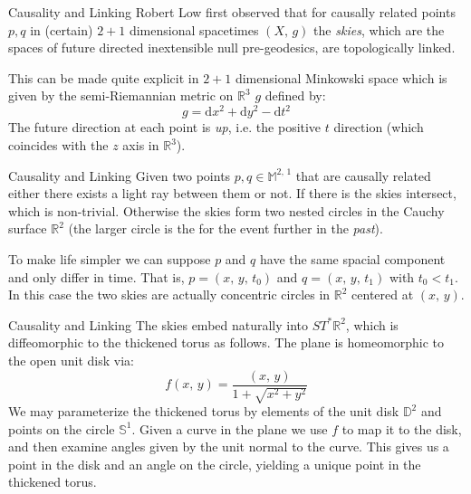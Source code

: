 \documentclass{beamer}
\begin{document}
    \begin{frame}{Causality and Linking}
        Robert Low first observed that for causally related points $p,q$ in
        (certain) $2+1$ dimensional spacetimes $(X,\,g)$ the \textit{skies},
        which are the spaces of future directed inextensible null
        pre-geodesics, are topologically linked.
        \par\hfill\par
        This can be made quite explicit in $2+1$ dimensional Minkowski space
        which is given by the semi-Riemannian metric on $\mathbb{R}^{3}$ $g$
        defined by:
        \begin{equation}
            g=\textrm{d}x^{2}+\textrm{d}y^{2}-\textrm{d}t^{2}
        \end{equation}
        The future direction at each point is \textit{up}, i.e. the positive
        $t$ direction (which coincides with the $z$ axis in $\mathbb{R}^{3}$).
    \end{frame}
    \begin{frame}{Causality and Linking}
        Given two points $p,q\in\mathbb{M}^{2,\,1}$ that are causally related
        either there exists a light ray between them or not. If there is the
        skies intersect, which is non-trivial. Otherwise the skies form two
        nested circles in the Cauchy surface $\mathbb{R}^{2}$ (the larger
        circle is the for the event further in the \textit{past}).
        \par\hfill\par
        To make life simpler we can suppose $p$ and $q$ have the same spacial
        component and only differ in time. That is, $p=(x,\,y,\,t_{0})$ and
        $q=(x,\,y,\,t_{1})$ with $t_{0}<t_{1}$. In this case the two skies are
        actually concentric circles in $\mathbb{R}^{2}$ centered at $(x,\,y)$.
    \end{frame}
    \begin{frame}{Causality and Linking}
        The skies embed naturally into $ST^{*}\mathbb{R}^{2}$, which is
        diffeomorphic to the thickened torus as follows. The plane is
        homeomorphic to the open unit disk via:
        \begin{equation}
            f(x,\,y)=\frac{(x,\,y)}{1+\sqrt{x^{2}+y^{2}}}
        \end{equation}
        We may parameterize the thickened torus by elements of the unit disk
        $\mathbb{D}^{2}$ and points on the circle $\mathbb{S}^{1}$. Given a
        curve in the plane we use $f$ to map it to the disk, and then examine
        angles given by the unit normal to the curve. This gives us a point in
        the disk and an angle on the circle, yielding a unique point in the
        thickened torus.
    \end{frame}
\end{document}
